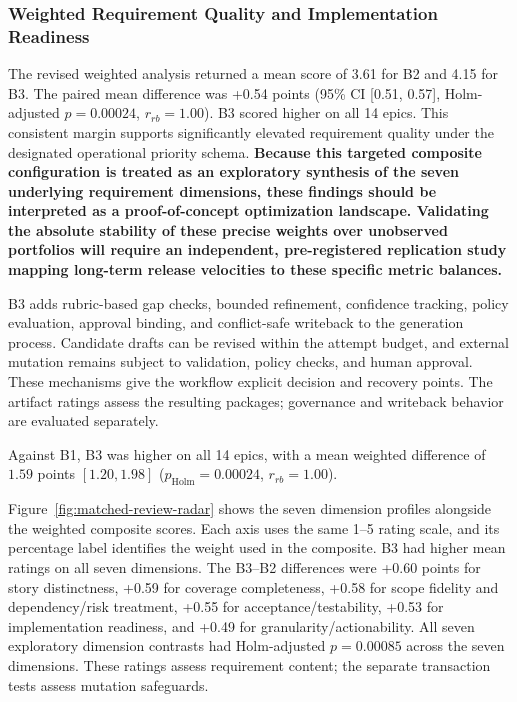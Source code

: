 \documentclass[manuscript,review]{acmart}
\begin{document}
\subsubsection{Weighted Requirement Quality and Implementation Readiness}
The revised weighted analysis returned a mean score of 3.61 for B2 and 4.15 for B3. The paired mean difference was +0.54 points (95\% CI [0.51, 0.57], Holm-adjusted $p=0.00024$, $r_{rb}=1.00$). B3 scored higher on all 14 epics. This consistent margin supports significantly elevated requirement quality under the designated operational priority schema. \textbf{Because this targeted composite configuration is treated as an exploratory synthesis of the seven underlying requirement dimensions, these findings should be interpreted as a proof-of-concept optimization landscape. Validating the absolute stability of these precise weights over unobserved portfolios will require an independent, pre-registered replication study mapping long-term release velocities to these specific metric balances.}

B3 adds rubric-based gap checks, bounded refinement, confidence tracking, policy evaluation, approval binding, and conflict-safe writeback to the generation process. Candidate drafts can be revised within the attempt budget, and external mutation remains subject to validation, policy checks, and human approval. These mechanisms give the workflow explicit decision and recovery points. The artifact ratings assess the resulting packages; governance and writeback behavior are evaluated separately.

Against B1, B3 was higher on all 14 epics, with a mean weighted difference of \(1.59\) points \([1.20, 1.98]\) (\(p_{\mathrm{Holm}}=0.00024\), \(r_{rb}=1.00\)).

Figure~\ref{fig:matched-review-radar} shows the seven dimension profiles alongside the weighted composite scores. Each axis uses the same 1--5 rating scale, and its percentage label identifies the weight used in the composite. B3 had higher mean ratings on all seven dimensions. The B3--B2 differences were +0.60 points for story distinctness, +0.59 for coverage completeness, +0.58 for scope fidelity and dependency/risk treatment, +0.55 for acceptance/testability, +0.53 for implementation readiness, and +0.49 for granularity/actionability. All seven exploratory dimension contrasts had Holm-adjusted $p=0.00085$ across the seven dimensions. These ratings assess requirement content; the separate transaction tests assess mutation safeguards.
\end{document}
